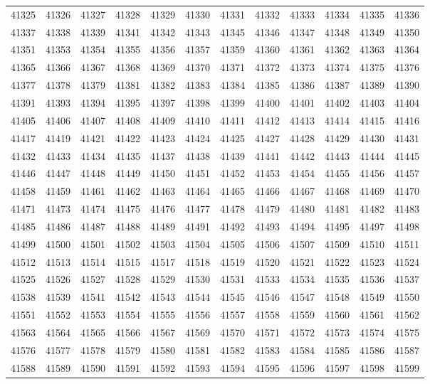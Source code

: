 \begin{center}
\begin{longtable}{llllllllllll}
41325 &41326 &41327 &41328 &41329 &41330 &41331 &41332 &41333 &41334 &41335 &41336 \\
41337 &41338 &41339 &41341 &41342 &41343 &41345 &41346 &41347 &41348 &41349 &41350 \\
41351 &41353 &41354 &41355 &41356 &41357 &41359 &41360 &41361 &41362 &41363 &41364 \\
41365 &41366 &41367 &41368 &41369 &41370 &41371 &41372 &41373 &41374 &41375 &41376 \\
41377 &41378 &41379 &41381 &41382 &41383 &41384 &41385 &41386 &41387 &41389 &41390 \\
41391 &41393 &41394 &41395 &41397 &41398 &41399 &41400 &41401 &41402 &41403 &41404 \\
41405 &41406 &41407 &41408 &41409 &41410 &41411 &41412 &41413 &41414 &41415 &41416 \\
41417 &41419 &41421 &41422 &41423 &41424 &41425 &41427 &41428 &41429 &41430 &41431 \\
41432 &41433 &41434 &41435 &41437 &41438 &41439 &41441 &41442 &41443 &41444 &41445 \\
41446 &41447 &41448 &41449 &41450 &41451 &41452 &41453 &41454 &41455 &41456 &41457 \\
41458 &41459 &41461 &41462 &41463 &41464 &41465 &41466 &41467 &41468 &41469 &41470 \\
41471 &41473 &41474 &41475 &41476 &41477 &41478 &41479 &41480 &41481 &41482 &41483 \\
41485 &41486 &41487 &41488 &41489 &41491 &41492 &41493 &41494 &41495 &41497 &41498 \\
41499 &41500 &41501 &41502 &41503 &41504 &41505 &41506 &41507 &41509 &41510 &41511 \\
41512 &41513 &41514 &41515 &41517 &41518 &41519 &41520 &41521 &41522 &41523 &41524 \\
41525 &41526 &41527 &41528 &41529 &41530 &41531 &41533 &41534 &41535 &41536 &41537 \\
41538 &41539 &41541 &41542 &41543 &41544 &41545 &41546 &41547 &41548 &41549 &41550 \\
41551 &41552 &41553 &41554 &41555 &41556 &41557 &41558 &41559 &41560 &41561 &41562 \\
41563 &41564 &41565 &41566 &41567 &41569 &41570 &41571 &41572 &41573 &41574 &41575 \\
41576 &41577 &41578 &41579 &41580 &41581 &41582 &41583 &41584 &41585 &41586 &41587 \\
41588 &41589 &41590 &41591 &41592 &41593 &41594 &41595 &41596 &41597 &41598 &41599 \\

\end{longtable}
\end{center}

